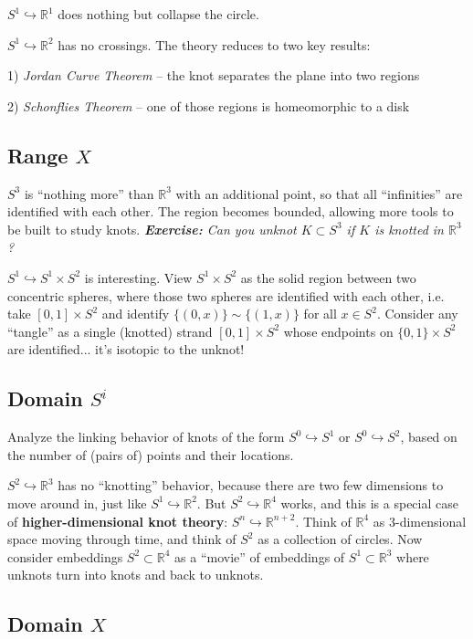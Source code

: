 \documentclass[11pt]{article}
\newcommand{\R}{\mathbb{R}}
\theoremstyle{plain}
\theoremstyle{definition}
\begin{document}
\bigskip
$S^1\hookrightarrow \R^1$ does nothing but collapse the circle.

\bigskip
$S^1\hookrightarrow \R^2$ has no crossings. The theory reduces to two key results:

1) \textit{Jordan Curve Theorem} -- the knot separates the plane into two regions

2) \textit{Schonflies Theorem} -- one of those regions is homeomorphic to a disk


\subsection{Range $X$}

$S^3$ is ``nothing more'' than $\R^3$ with an additional point, so that all ``infinities'' are identified with each other. The region becomes bounded, allowing more tools to be built to study knots. \textit{\textbf{Exercise:} Can you unknot $K\subset S^3$ if $K$ is knotted in $\R^3$?}

\bigskip
$S^1\hookrightarrow S^1\times S^2$ is interesting. View $S^1\times S^2$ as the solid region between two concentric spheres, where those two spheres are identified with each other, i.e. take $[0,1]\times S^2$ and identify $\lbrace(0,x)\rbrace\sim\lbrace(1,x)\rbrace$ for all $x\in S^2$. Consider any ``tangle'' as a single (knotted) strand $[0,1]\times S^2$ whose endpoints on $\lbrace0,1\rbrace\times S^2$ are identified... it's isotopic to the unknot!

\subsection{Domain $S^i$}

Analyze the linking behavior of knots of the form $S^0\hookrightarrow S^1$ or $S^0\hookrightarrow S^2$, based on the number of (pairs of) points and their locations.

\bigskip
$S^2\hookrightarrow\R^3$ has no ``knotting'' behavior, because there are two few dimensions to move around in, just like $S^1\hookrightarrow\R^2$. But $S^2\hookrightarrow\R^4$ works, and this is a special case of \textbf{higher-dimensional knot theory}: $S^n\hookrightarrow\R^{n+2}$. Think of $\R^4$ as 3-dimensional space moving through time, and think of $S^2$ as a collection of circles. Now consider embeddings $S^2\subset\R^4$ as a ``movie'' of embeddings of $S^1\subset\R^3$ where unknots turn into knots and back to unknots.


\subsection{Domain $X$}
\end{document}
